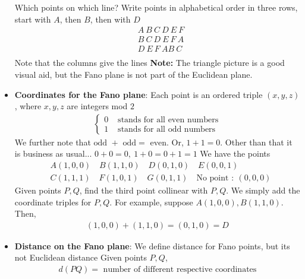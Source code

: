 \documentclass{report}
\begin{document}
\begin{itemize}
\begin{figure}[ht]
            \label{fig:fano}
        \end{figure}
        \bigbreak \noindent 
        Which points on which line? Write points in alphabetical order in three rows, start with $A$, then $B$, then with $D$
        \begin{align*}
            &A \ B \ C \ D \ E \ F \\
            &B \ C \ D \ E \ F \ A\\
            &D \ E \ F \ A B \ C \ \\
        \end{align*}
        Note that the columns give the lines
        \bigbreak \noindent 
        \textbf{Note:} The triangle picture is a good visual aid, but the Fano plane is not part of the Euclidean plane.
    \item \textbf{Coordinates for the Fano plane}: Each point is an ordered triple $(x,y,z) $, where $x,y,z$ are integers mod $2$
        \begin{align*}
            \begin{cases}
            0 & \text{ stands for all even numbers}     \\
            1 & \text{ stands for all odd numbers}     
            \end{cases}
        \end{align*}
        We further note that $\text{odd } + \text{ odd} = \text{ even}$. Or, $1 +1 = 0 $. Other than that it is business as usual... $0+0 =0,\ 1+0 = 0 + 1 =  1$
        \bigbreak \noindent 
        We have the points
        \begin{align*}
            &A(1,0,0) \quad B(1,1,0) \quad D(0,1,0) \quad E(0,0,1) \\
            &C(1,1,1) \quad F(1,0,1) \quad G(0,1,1) \quad \text{No point }:\ (0,0,0)
        \end{align*}
        \bigbreak \noindent 
        Given points $P,Q$, find the third point collinear with $P,Q$. We simply add the coordinate triples for $P,Q$. For example, suppose $A(1,0,0), B(1,1,0)$. Then,
        \begin{align*}
            (1,0,0) + (1,1,0) = (0,1,0) = D
        \end{align*}
    \item \textbf{Distance on the Fano plane}: We define distance for Fano points, but its not Euclidean distance
        \bigbreak \noindent 
        Given points $P,Q$,
        \begin{align*}
            d(PQ) = \text{ number of different respective coordinates}

\end{align*}
\end{itemize}
\end{document}
